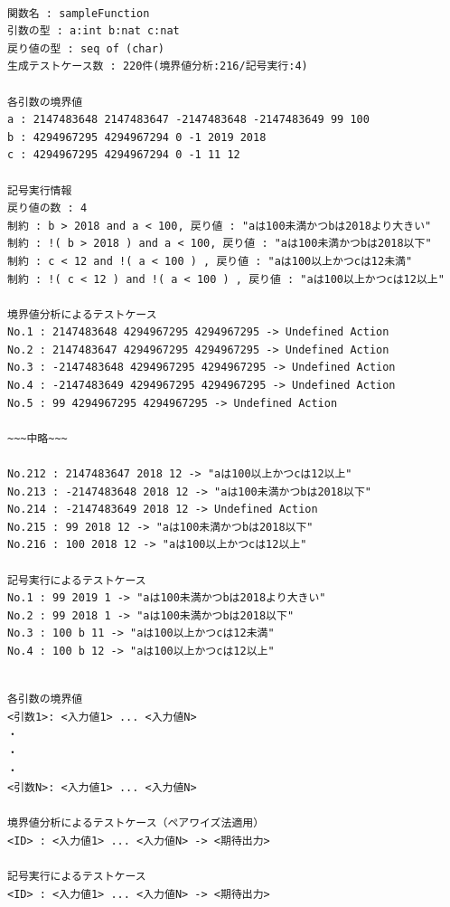 \documentclass[uplatex, report, a4j, 10pt]{jsbook}
\begin{document}
\lstset{language=}
\noindent\begin{minipage}{\textwidth}
  \begin{lstlisting}[caption=既存のBWDMのテストケース出力例(コード\ref{fig:input_sample}を適用),label=fig:testcase_sample]

関数名 : sampleFunction
引数の型 : a:int b:nat c:nat 
戻り値の型 : seq of (char)
生成テストケース数 : 220件(境界値分析:216/記号実行:4)

各引数の境界値
a : 2147483648 2147483647 -2147483648 -2147483649 99 100 
b : 4294967295 4294967294 0 -1 2019 2018 
c : 4294967295 4294967294 0 -1 11 12 

記号実行情報
戻り値の数 : 4
制約 : b > 2018 and a < 100, 戻り値 : "aは100未満かつbは2018より大きい"
制約 : !( b > 2018 ) and a < 100, 戻り値 : "aは100未満かつbは2018以下"
制約 : c < 12 and !( a < 100 ) , 戻り値 : "aは100以上かつcは12未満"
制約 : !( c < 12 ) and !( a < 100 ) , 戻り値 : "aは100以上かつcは12以上"

境界値分析によるテストケース
No.1 : 2147483648 4294967295 4294967295 -> Undefined Action
No.2 : 2147483647 4294967295 4294967295 -> Undefined Action
No.3 : -2147483648 4294967295 4294967295 -> Undefined Action
No.4 : -2147483649 4294967295 4294967295 -> Undefined Action
No.5 : 99 4294967295 4294967295 -> Undefined Action

~~~中略~~~

No.212 : 2147483647 2018 12 -> "aは100以上かつcは12以上"
No.213 : -2147483648 2018 12 -> "aは100未満かつbは2018以下"
No.214 : -2147483649 2018 12 -> Undefined Action
No.215 : 99 2018 12 -> "aは100未満かつbは2018以下"
No.216 : 100 2018 12 -> "aは100以上かつcは12以上"

記号実行によるテストケース
No.1 : 99 2019 1 -> "aは100未満かつbは2018より大きい"
No.2 : 99 2018 1 -> "aは100未満かつbは2018以下"
No.3 : 100 b 11 -> "aは100以上かつcは12未満"
No.4 : 100 b 12 -> "aは100以上かつcは12以上"

\end{lstlisting}
\end{minipage}

\lstset{language=}
\noindent\begin{minipage}{\textwidth}
  \begin{lstlisting}[caption=既存のBWDMのテストケースの出力フォーマット,label=fig:bwdm_format]

各引数の境界値
<引数1>: <入力値1> ... <入力値N>
・
・
・
<引数N>: <入力値1> ... <入力値N>

境界値分析によるテストケース（ペアワイズ法適用）
<ID> : <入力値1> ... <入力値N> -> <期待出力>

記号実行によるテストケース
<ID> : <入力値1> ... <入力値N> -> <期待出力>

\end{lstlisting}
\end{minipage}
\end{document}
